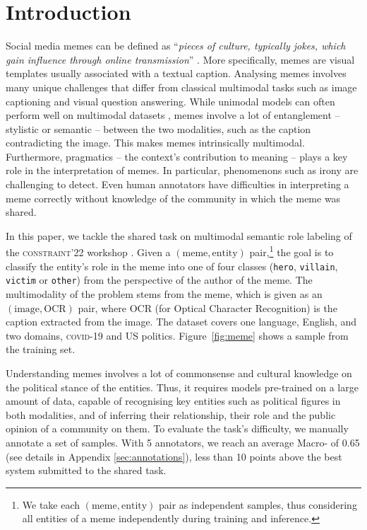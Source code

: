 \section{Introduction}

Social media memes can be defined as ``\emph{pieces of culture, typically jokes, which gain influence through online transmission}'' \cite{Davison2012}. More specifically, memes are visual templates usually associated with a textual caption. Analysing memes involves many unique challenges that differ from classical multimodal tasks such as image captioning and visual question answering.
While unimodal models can often perform well on multimodal datasets \citep{vqa_bias}, memes involve a lot of entanglement -- stylistic or semantic -- between the two modalities, such as the caption contradicting the image. This makes memes intrinsically multimodal.
Furthermore, pragmatics -- the context's contribution to meaning -- plays a key role in the interpretation of memes. In particular, phenomenons such as irony are challenging to detect. Even human annotators have difficulties in interpreting a meme correctly without knowledge of the community in which the meme was shared.

In this paper, we tackle the shared task on multimodal semantic role labeling of the \textsc{constraint}'22 workshop \citep{sharma2022report}.
Given a \((\text{meme}, \text{entity})\) pair,\footnote{We take each \((\text{meme}, \text{entity})\) pair as independent samples, thus considering all entities of a meme independently during training and inference.} the goal is to classify the entity's role in the meme into one of four classes (\texttt{hero}, \texttt{villain}, \texttt{victim} or \texttt{other}) from the perspective of the author of the meme.
The multimodality of the problem stems from the meme, which is given as an \((\text{image}, \text{OCR})\) pair, where OCR (for Optical Character Recognition) is the caption extracted from the image.
The dataset covers one language, English, and two domains, \textsc{covid}-19 and US politics. Figure~\ref{fig:meme} shows a sample from the training set.

Understanding memes involves a lot of commonsense and cultural knowledge on the political stance of the entities.
Thus, it requires models pre-trained on a large amount of data, capable of recognising key entities such as political figures in both modalities, and of inferring their relationship, their role and the public opinion of a community on them.
To evaluate the task's difficulty, we manually annotate a set of samples. With 5 annotators, we reach an average Macro-\fone{} of 0.65 (see details in Appendix \ref{sec:annotations}), less than 10 points above the best system submitted to the shared task.

